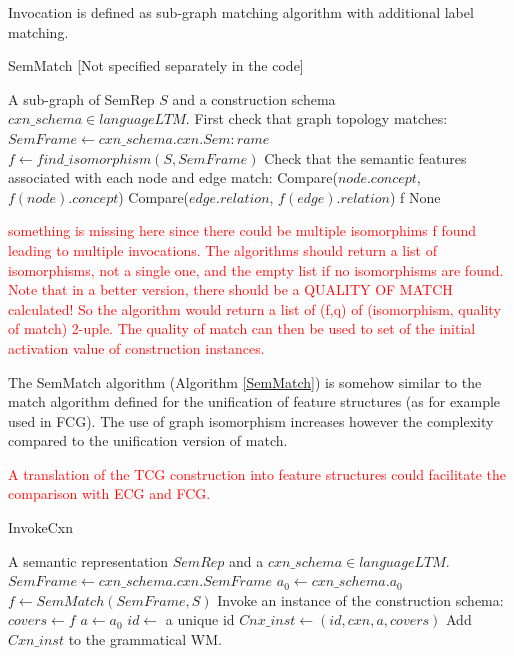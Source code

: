 \documentclass{article}
\newcommand\todo[1]{\textcolor{red}{#1}}
\begin{document}
Invocation is defined as sub-graph matching algorithm with additional label matching.

\begin{algorithm}[H]
\caption{SemMatch [Not specified separately in the code]}
\label{SemMatch}
\begin{algorithmic}
	\REQUIRE A sub-graph of SemRep $S$ and a construction schema $cxn\_schema \in languageLTM$.
	\STATE First check that graph topology matches:
	\STATE $SemFrame \leftarrow cxn\_schema.cxn.Sem:rame$
	\STATE $f \leftarrow find\_isomorphism(S,SemFrame)$
		\STATE Check that the semantic features associated with each node and edge match:
			\STATE Compare($node.concept$, $f(node).concept$)
			\STATE Compare($edge.relation$, $f(edge).relation$)
		\ENDFOR
	\ENDIF
		\RETURN f
	\ELSE
		\RETURN None
	\ENDIF
\end{algorithmic}
\end{algorithm}

\todo{something is missing here since there could be multiple isomorphims f found leading to multiple invocations. The algorithms should return a list of isomorphisms, not a single one, and the empty list if no isomorphisms are found. Note that in a better version, there should be a QUALITY OF MATCH calculated! So the algorithm would return a list of (f,q) of (isomorphism, quality of match) 2-uple. The quality of match can then be used to set of the initial activation value of construction instances.}

The SemMatch algorithm (Algorithm \ref{SemMatch}) is somehow similar to the match algorithm defined for the unification of feature structures (as for example used in FCG). The use of graph isomorphism increases however the complexity compared to the unification version of match.

\todo{A translation of the TCG construction into feature structures could facilitate the comparison with ECG and FCG.}


\begin{algorithm}[H]
\caption{InvokeCxn}
\label{InvokeCxn}
\begin{algorithmic}
	\REQUIRE A semantic representation $SemRep$ and a $cxn\_schema \in languageLTM$.
    \STATE $SemFrame \leftarrow cxn\_schema.cxn.SemFrame$
    \STATE $a_0 \leftarrow cxn\_schema.a_0$
    	\STATE $f \leftarrow SemMatch(SemFrame, S)$
    		\STATE Invoke an instance of the construction schema:
    		\STATE $covers \leftarrow f$
    		\STATE $a \leftarrow a_0$
    		\STATE $id \leftarrow$ a unique id
    		\STATE $Cnx\_inst \leftarrow (id, cxn, a, covers)$
    		\STATE Add $Cxn\_inst$ to the grammatical WM.
    	\ENDIF	 
    \ENDFOR
\end{algorithmic}
\end{algorithm}
\end{document}
